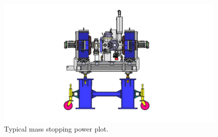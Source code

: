 \begin{figure}[ht]
	\includegraphics[width=\textwidth]{03_Prototype/figures/00_fig/fig007_LWU.jpeg}
	\caption[Typical mass stopping power plot]{Typical mass stopping power plot.}
	\label{chap3:maxwell_gas_log1}
\end{figure}
